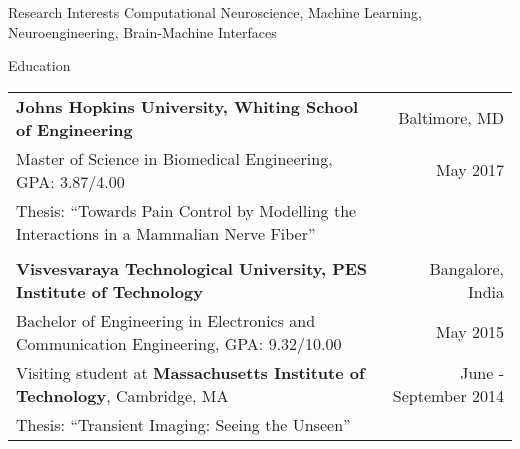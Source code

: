 \documentclass{resume}
\begin{document}
\thispagestyle{empty}
  \begin{rSection}{Research Interests}
Computational Neuroscience, Machine Learning, Neuroengineering, Brain-Machine Interfaces
  \end{rSection}
  \begin{rSection}{Education}
\begin{tabular*}{\textwidth}{@{\extracolsep{\fill}}lr@{}}
\textbf{Johns Hopkins University, Whiting School of Engineering} & Baltimore, MD \\
{Master of Science in Biomedical Engineering}, GPA: 3.87/4.00 & May 2017 \\
Thesis: {``Towards Pain Control by Modelling the Interactions in a Mammalian Nerve Fiber''}\\ \\
\textbf{Visvesvaraya Technological University, PES Institute of Technology} & Bangalore, India \\
{Bachelor of Engineering in Electronics and Communication Engineering}, GPA: 9.32/10.00 & May 2015 \\
Visiting student at \textbf{Massachusetts Institute of Technology}, Cambridge, MA & June - September 2014 \\
Thesis: {``Transient Imaging: Seeing the Unseen''}\\
\end{tabular*}
  \end{rSection}

\vspace{1em}
\end{document}
